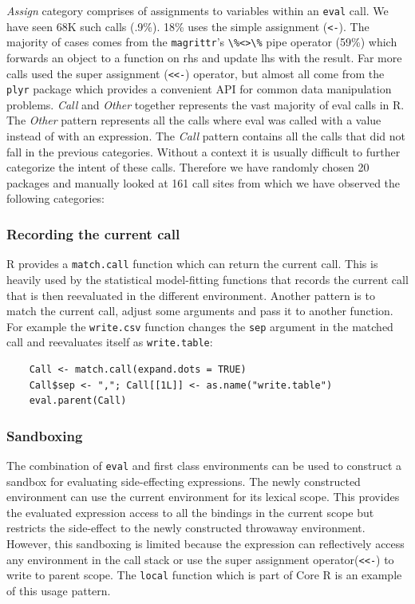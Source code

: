 \documentclass[a4paper,USenglish,cleveref, autoref, thm-restate]{lipics-v2019}
\newcommand{\PatternAssignRnd}{68K\xspace}
\newcommand{\PatternAssignRatio}{.9\%\xspace}
\newcommand{\PatternAssignArrowRatio}{18\%\xspace}
\newcommand{\PatternAssignArrowMagrittrRatio}{59\%\xspace}
\newcommand{\PatternManualPackages}{20\xspace}
\newcommand{\PatternManualCallsites}{161\xspace}
\newcommand{\eval}{\texttt{eval}\xspace}
\renewcommand{\c}[1]{\lstinline{#1}\xspace}
\begin{document}
%
\noindent \emph{Assign} category comprises of assignments to variables
within an \eval call. We have seen \PatternAssignRnd such calls
(\PatternAssignRatio).  \PatternAssignArrowRatio uses the simple assignment
(\c{<-}). The majority of cases comes from the \c{magrittr}'s \c{\%<>\%}
pipe operator (\PatternAssignArrowMagrittrRatio) which forwards an object to
a function on rhs and update lhs with the result. Far more calls used the
super assignment (\c{<<-}) operator, but almost all come from the \c{plyr}
package which provides a convenient API for common data manipulation
problems.
%
\noindent \emph{Call} and \emph{Other} together represents the vast majority
of eval calls in R. The \emph{Other} pattern represents all the calls where
eval was called with a value instead of with an expression. The \emph{Call}
pattern contains all the calls that did not fall in the previous
categories. Without a context it is usually difficult to further categorize
the intent of these calls.  Therefore we have randomly chosen
\PatternManualPackages packages and manually looked at
\PatternManualCallsites call sites from which we have observed the following
categories:

\subsubsection{Recording the current call} R provides a \c{match.call} function
which can return the current call. This is heavily used by the statistical
model-fitting functions that records the current call that is then
reevaluated in the different environment. Another pattern is to match the
current call, adjust some arguments and pass it to another function. For
example the \c{write.csv} function changes the \c{sep} argument in the
matched call and reevaluates itself as \c{write.table}:
%
\begin{lstlisting}
    Call <- match.call(expand.dots = TRUE)
    Call$sep <- ","; Call[[1L]] <- as.name("write.table")
    eval.parent(Call)
\end{lstlisting}

\subsubsection{Sandboxing} The combination of \eval and first class
environments can be used to construct a sandbox for evaluating
side-effecting expressions. The newly constructed environment can use the
current environment for its lexical scope. This provides the evaluated
expression access to all the bindings in the current scope but restricts the
side-effect to the newly constructed throwaway environment. However, this
sandboxing is limited because the expression can reflectively access any
environment in the call stack or use the super assignment operator(\c{<<-})
to write to parent scope. The \c{local} function which is part of Core R is
an example of this usage pattern.
\end{document}
